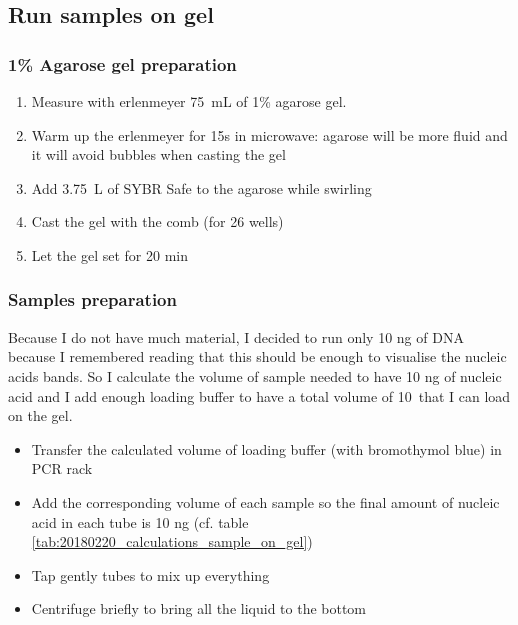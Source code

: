 \subsection{Run samples on gel}
\label{task:20180220_cj1}


\subsubsection{1\% Agarose gel preparation}

\begin{enumerate}
\item Measure with erlenmeyer 75~mL of 1\% agarose gel.
\item Warm up the erlenmeyer for 15s in microwave: agarose will be more fluid and it will avoid bubbles when casting the gel
\item Add 3.75~\textmu L of SYBR Safe to the agarose while swirling 
\item Cast the gel with the comb (for 26 wells)
\item Let the gel set for 20 min
\end{enumerate}

\subsubsection{Samples preparation}

Because I do not have much material, I decided to run only 10 ng of DNA because I remembered reading that this should be enough to visualise the nucleic acids bands. So I calculate the volume of sample needed to have 10 ng of nucleic acid and I add enough loading buffer to have a total volume of 10~\uL that I can load on the gel.


\begin{itemize}
\item Transfer the calculated volume of loading buffer (with bromothymol blue) in PCR rack
\item Add the corresponding volume of each sample so the final amount of nucleic acid in each tube is 10 ng (cf. table \ref{tab:20180220_calculations_sample_on_gel})
\item Tap gently tubes to mix up everything
\item Centrifuge briefly to bring all the liquid to the bottom
\end{itemize}


